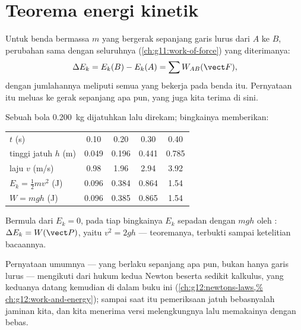 \section{Teorema energi kinetik}

\begin{theorem}\label{thm:g11:mechanical-energy:ketheorem}
Untuk benda bermassa $m$ yang bergerak sepanjang garis lurus dari $A$ ke
$B$, perubahan  sama dengan  seluruhnya
(\cref{ch:g11:work-of-force}) yang diterimanya:
\[
\Delta E_k = E_k(B) - E_k(A) = \sum W_{AB}(\vect F),
\]
dengan jumlahannya meliputi semua  yang bekerja pada benda itu.
Pernyataan itu meluas ke gerak sepanjang  apa pun, yang juga
kita terima di sini.
\end{theorem}
\admitted

\begin{example}\label{ex:g11:mechanical-energy:freefall}
Sebuah bola \qty{0.200}{kg} dijatuhkan lalu direkam; bingkainya
memberikan:
\begin{center}\small
\begin{tabular}{lcccc}
$t$ (\unit{s}) & 0.10 & 0.20 & 0.30 & 0.40\\
tinggi jatuh $h$ (\unit{m}) & 0.049 & 0.196 & 0.441 & 0.785\\
laju $v$ (\unit{m/s}) & 0.98 & 1.96 & 2.94 & 3.92\\
$E_k = \tfrac12 mv^2$ (\unit{J}) & 0.096 & 0.384 & 0.864 & 1.54\\
$W = mgh$ (\unit{J}) & 0.096 & 0.385 & 0.865 & 1.54
\end{tabular}
\end{center}
Bermula dari $E_k = 0$, pada tiap bingkainya $E_k$ sepadan dengan 
$mgh$ oleh : $\Delta E_k = W(\vect P)$, yaitu $v^2 = 2gh$ ---
teoremanya, terbukti sampai ketelitian bacaannya.
\end{example}

\begin{remark}\label{rem:g11:mechanical-energy:proof}
Pernyataan umumnya --- yang berlaku sepanjang  apa pun, bukan
hanya garis lurus --- mengikuti dari hukum kedua Newton beserta sedikit
kalkulus, yang keduanya datang kemudian di dalam buku ini
(\cref{ch:g12:newtons-laws,%
ch:g12:work-and-energy}); sampai saat itu pemeriksaan jatuh bebasnyalah
jaminan kita, dan kita menerima versi  melengkungnya lalu
memakainya dengan bebas.
\end{remark}

